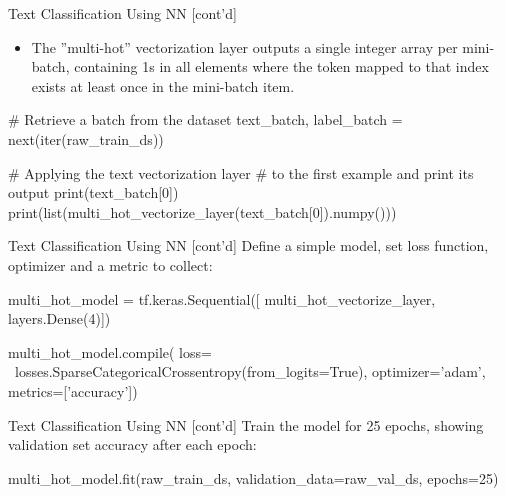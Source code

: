 \documentclass[ignorenonframetext,xcolor=x11names]{beamer}
\begin{document}
\begin{frame}[label=withcode,fragile]{Text Classification Using NN \small [cont'd]}
\begin{itemize}
   \item The ''multi-hot'' vectorization layer outputs a single integer array per mini-batch, containing 1s in all elements where the token mapped to that index exists at least once in the mini-batch item. 
\end{itemize}

\begin{pythoncode}
# Retrieve a batch from the dataset
text_batch, label_batch = next(iter(raw_train_ds))

# Applying the text vectorization layer 
# to the first example and print its output
print(text_batch[0])
print(list(multi_hot_vectorize_layer(text_batch[0]).numpy()))
\end{pythoncode}
\end{frame}

\begin{frame}[label=withcode,fragile]{Text Classification Using NN \small [cont'd]}
Define a simple model, set loss function, optimizer and a metric to collect:
\begin{pythoncode}
multi_hot_model = tf.keras.Sequential([
    multi_hot_vectorize_layer,
    layers.Dense(4)])

multi_hot_model.compile(
    loss= \
      losses.SparseCategoricalCrossentropy(from_logits=True),
    optimizer='adam',
    metrics=['accuracy'])
\end{pythoncode}
\end{frame}

\begin{frame}[label=withcode,fragile]{Text Classification Using NN \small [cont'd]}
Train the model for 25 epochs, showing validation set accuracy after each epoch:
\begin{pythoncode}
multi_hot_model.fit(raw_train_ds, 
                    validation_data=raw_val_ds, 
                    epochs=25)
\end{pythoncode}
\end{frame}
\end{document}
